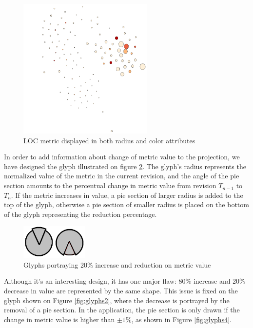 \begin{figure}[H]
  \centering
  \includegraphics[width=0.6\textwidth]{figures/max_inh_tree.png}
  \caption{LOC metric displayed in both radius and color attributes}
  \label{fig:max_inh_tree}
\end{figure}

In order to add information about change of metric value to the projection, we have designed the glyph illustrated on figure \ref{fig:glyphs1}. The glyph's radius represents the normalized value of the metric in the current revision, and the angle of the pie section amounts to the percentual change in metric value from revision $T_{n-1}$ to $T_{n}$. If the metric increases in value, a pie section of larger radius is added to the top of the glyph, otherwise a pie section of smaller radius is placed on the bottom of the glyph representing the reduction percentage.

\begin{figure}[H]
  \centering
  \includegraphics[width=0.3\textwidth]{figures/glyphs_1.png}
  \caption{Glyphs portraying 20\% increase and reduction on metric value}
  \label{fig:glyphs1}
\end{figure}

Although it's an interesting design, it has one major flaw: 80\% increase and 20\% decrease in value are represented by the same shape. This issue is fixed on the glyph shown on Figure \ref{fig:glyphs2}, where the decrease is portrayed by the removal of a pie section. In the application, the pie section is only drawn if the change in metric value is higher than $\pm1\%$, as shown in Figure \ref{fig:glyphs4}.

